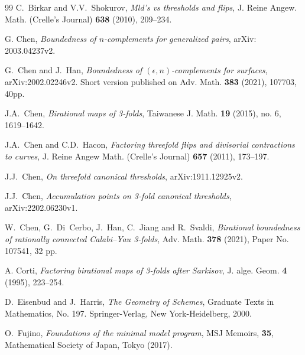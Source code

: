 \documentclass[11pt]{amsart}
\numberwithin{equation}{section}
\theoremstyle{definition}
\theoremstyle{definition}
\begin{document}
\begin{thebibliography}{99}
 C.~Birkar and V.V.~Shokurov, \textit{Mld's vs thresholds and flips}, J. Reine Angew. Math. (Crelle's Journal) \textbf{638} (2010), 209--234.



 G. Chen, \textit{Boundedness of $n$-complements for generalized pairs}, arXiv: 2003.04237v2.

 G.~Chen and J.~Han,
\textit{Boundedness of $(\epsilon, n)$-complements for surfaces}, arXiv:2002.02246v2. Short version published on Adv. Math. \textbf{383} (2021), 107703, 40pp.

 J.A.~Chen, \textit{Birational maps of 3-folds}, Taiwanese J. Math. \textbf{19} (2015), no. 6, 1619--1642.

 J.A.~Chen and C.D.~Hacon, \textit{Factoring threefold flips and divisorial contractions to curves}, J. Reine Angew Math. (Crelle's Journal) \textbf{657} (2011), 173--197.



 J.J.~Chen, \textit{On threefold canonical thresholds}, arXiv:1911.12925v2.

 J.J.~Chen, \textit{Accumulation points on 3-fold canonical thresholds}, arXiv:2202.06230v1.

 W.~Chen, G.~Di~Cerbo, J.~Han, C.~Jiang and R.~Svaldi, \textit{Birational boundedness of rationally connected Calabi--Yau 3-folds},  Adv. Math. \textbf{378} (2021), Paper No. 107541, 32 pp.

 A. Corti, \textit{Factoring birational maps of 3-folds after Sarkisov}, J. alge. Geom. \textbf{4} (1995), 223--254.
	
 D.~Eisenbud and J.~Harris,
\textit{The Geometry of Schemes}, 
Graduate Texts in Mathematics, No. 197. Springer-Verlag, New York-Heidelberg, 2000.
	

 O.~Fujino, \textit{Foundations of the minimal model program}, MSJ Memoirs, \textbf{35}, Mathematical Society of Japan, Tokyo (2017).


\end{thebibliography}
\end{document}
